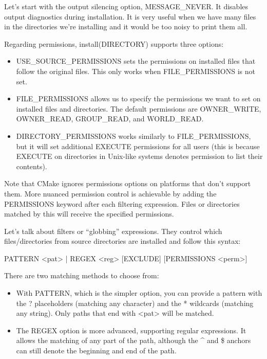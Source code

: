 Let’s start with the output silencing option, MESSAGE\_NEVER. It disables output diagnostics during installation. It is very useful when we have many files in the directories we’re installing and it would be too noisy to print them all.

Regarding permissions, install(DIRECTORY) supports three options:

\begin{itemize}
\item
USE\_SOURCE\_PERMISSIONS sets the permissions on installed files that follow the original files. This only works when FILE\_PERMISSIONS is not set.

\item
FILE\_PERMISSIONS allows us to specify the permissions we want to set on installed files and directories. The default permissions are OWNER\_WRITE, OWNER\_READ, GROUP\_READ, and WORLD\_READ.

\item
DIRECTORY\_PERMISSIONS works similarly to FILE\_PERMISSIONS, but it will set additional EXECUTE permissions for all users (this is because EXECUTE on directories in Unix-like systems denotes permission to list their contents).
\end{itemize}

Note that CMake ignores permissions options on platforms that don’t support them. More nuanced permission control is achievable by adding the PERMISSIONS keyword after each filtering expression. Files or directories matched by this will receive the specified permissions.

Let’s talk about filters or “globbing” expressions. They control which files/directories from source directories are installed and follow this syntax:

\begin{shell}
PATTERN <pat> | REGEX <reg> [EXCLUDE] [PERMISSIONS <perm>]
\end{shell}

There are two matching methods to choose from:

\begin{itemize}
\item
With PATTERN, which is the simpler option, you can provide a pattern with the ? placeholders (matching any character) and the * wildcards (matching any string). Only paths that end with <pat> will be matched.

\item
The REGEX option is more advanced, supporting regular expressions. It allows the matching of any part of the path, although the \^{} and \$ anchors can still denote the beginning and end of the path.
\end{itemize}

